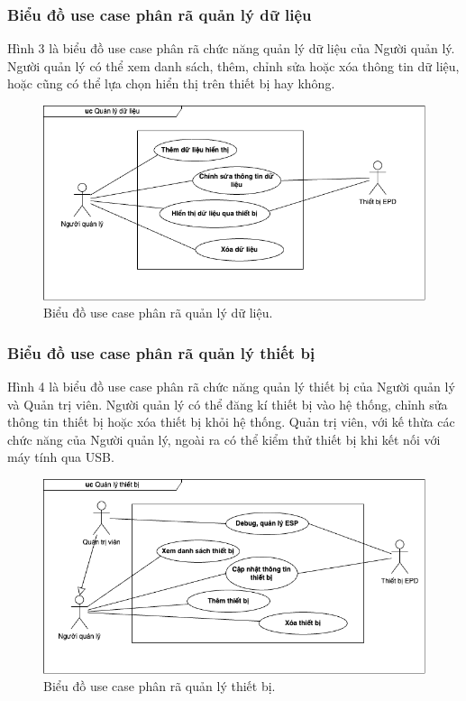 \documentclass[../DoAn.tex]{subfiles}
\begin{document}

\subsubsection{Biểu đồ use case phân rã quản lý dữ liệu}

Hình 3 là biểu đồ use case phân rã chức năng quản lý dữ liệu của Người quản lý. Người quản lý có thể xem danh sách, thêm, chỉnh sửa hoặc xóa thông tin dữ liệu, hoặc cũng có thể lựa chọn hiển thị trên thiết bị hay không. 
\begin{figure}[h]
    \centering
    \includegraphics[scale=0.6]{imgs/diagrams/uc_data.png}
    \caption{Biểu đồ use case phân rã quản lý dữ liệu.}
    \label{fig:uc-general}
\end{figure}

\subsubsection{Biểu đồ use case phân rã quản lý thiết bị}

Hình 4 là biểu đồ use case phân rã chức năng quản lý thiết bị của Người quản lý và Quản trị viên. Người quản lý có thể đăng kí thiết bị vào hệ thống, chỉnh sửa thông tin thiết bị hoặc xóa thiết bị khỏi hệ thống. Quản trị viên, với kế thừa các chức năng của Người quản lý, ngoài ra có thể kiểm thử thiết bị khi kết nối với máy tính qua USB.
\begin{figure}[h]
    \centering
    \includegraphics[scale=0.6]{imgs/diagrams/uc_device.png}
    \caption{Biểu đồ use case phân rã quản lý thiết bị.}
    \label{fig:uc-general}
\end{figure}
\end{document}
